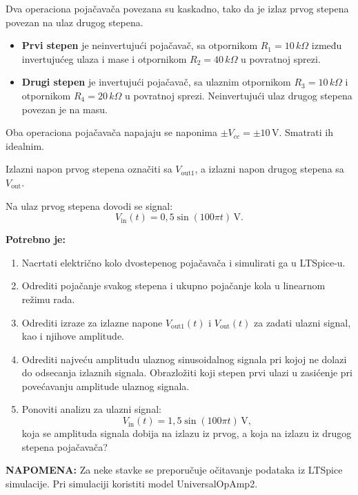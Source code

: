 \begin{zadatak}

    Dva operaciona pojačavača povezana su kaskadno, tako da je
    izlaz prvog stepena povezan na ulaz drugog stepena.

    \begin{itemize}
        \item \textbf{Prvi stepen} je neinvertujući pojačavač,
        sa otpornikom $R_1 = 10\,k\Omega$ između
        invertujućeg ulaza i mase i otpornikom
        $R_2 = 40\,k\Omega$ u povratnoj sprezi.

        \item \textbf{Drugi stepen} je invertujući pojačavač,
        sa ulaznim otpornikom $R_3 = 10\,k\Omega$
        i otpornikom $R_4 = 20\,k\Omega$ u povratnoj
        sprezi. Neinvertujući ulaz drugog stepena povezan
        je na masu.
    \end{itemize}

    Oba operaciona pojačavača napajaju se naponima
    $\pm V_{cc} = \pm 10\,\mathrm{V}$.
    Smatrati ih idealnim.

    Izlazni napon prvog stepena označiti sa
    $V_{\mathrm{out1}}$, a izlazni napon drugog stepena
    sa $V_{\mathrm{out}}$.

    Na ulaz prvog stepena dovodi se signal:
    \[
        V_{\mathrm{in}}(t)
        = 0{,}5\sin(100\pi t)\,\mathrm{V}.
    \]

    \noindent\textbf{Potrebno je:}

    \begin{enumerate}
        \setlength{\itemsep}{0.5em}

        \item[a)] Nacrtati električno kolo dvostepenog pojačavača i simulirati ga u LTSpice-u.

        \item[b)] Odrediti pojačanje svakog stepena i ukupno
        pojačanje kola u linearnom režimu rada.

        \item[c)] Odrediti izraze za izlazne napone
        $V_{\mathrm{out1}}(t)$ i $V_{\mathrm{out}}(t)$
        za zadati ulazni signal, kao i njihove amplitude.

        \item[d)] Odrediti najveću amplitudu ulaznog sinusoidalnog
        signala pri kojoj ne dolazi do odsecanja izlaznih signala.
        Obrazložiti koji stepen prvi ulazi u zasićenje pri
        povećavanju amplitude ulaznog signala.

        \item[e)] Ponoviti analizu za ulazni signal:
        \[
            V_{\mathrm{in}}(t)
            = 1{,}5\sin(100\pi t)\,\mathrm{V},
        \]
        koja se amplituda signala dobija na izlazu iz prvog, a koja na izlazu iz drugog stepena pojačavača?

    \end{enumerate}

    \noindent\textbf{NAPOMENA:}
    Za neke stavke se preporučuje očitavanje podataka iz LTSpice simulacije.\newline
    Pri simulaciji koristiti model UniversalOpAmp2.
\end{zadatak}